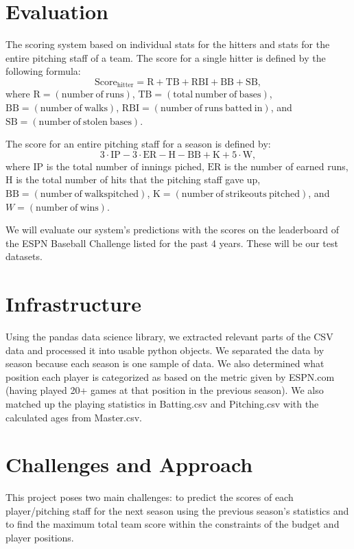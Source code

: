 \documentclass[12pt]{amsart}
\begin{document}
\section{\large Evaluation}
\label{eval}
The scoring system based on individual stats for the hitters and stats for the entire pitching staff of a team. The score for a single hitter is defined by the following formula:
\begin{equation}
\mathrm{Score_{hitter}} = \mathrm{R} + \mathrm{TB} + \mathrm{RBI} + \mathrm{BB} + \mathrm{SB},
\end{equation}
where 
$\mathrm{R}= (\mathrm{number\ of\ runs})$, $\mathrm{TB} = (\mathrm{total\ number\ of\ bases})$, $\mathrm{BB} = (\mathrm{number\ of\ walks})$, $\mathrm{RBI} = (\mathrm{number\ of\ runs\ batted\ in})$, and $\mathrm{SB} = (\mathrm{number\ of\ stolen\ bases})$. 
\vspace{.4cm}

The score for an entire pitching staff for a season is defined by:
\begin{equation}
3\cdot \mathrm{IP} - 3\cdot \mathrm{ER} - \mathrm{H} - \mathrm{BB} + \mathrm{K} + 5 \cdot \mathrm{W},
\end{equation}
where $\mathrm{IP}$ is the total number of innings piched, $\mathrm{ER}$ is the number of earned runs, $\mathrm{H}$ is the total number of hits that the pitching staff gave up, $\mathrm{BB} = (\mathrm{number\ of\ walks pitched})$, $\mathrm{K} = (\mathrm{number\ of\ strikeouts\ pitched})$, and $W = (\mathrm{number\ of\ wins})$.
\vspace{.4cm}

We will evaluate our system's predictions with the scores on the leaderboard of the ESPN Baseball Challenge listed for the past 4 years. These will be our test datasets.

\section{\large Infrastructure}
Using the pandas data science library, we extracted relevant parts of the CSV data and processed it into usable python objects. We separated the data by season because each season is one sample of data. We also determined what position each player is categorized as based on the metric given by ESPN.com (having played 20+ games at that position in the previous season). We also matched up the playing statistics in Batting.csv and Pitching.csv with the calculated ages from Master.csv.

\section{\large Challenges and Approach}
This project poses two main challenges: to predict the scores of each player/pitching staff for the next season using the previous season's statistics and to find the maximum total team score within the constraints of the budget and player positions.
\vspace{.4cm}
\end{document}
